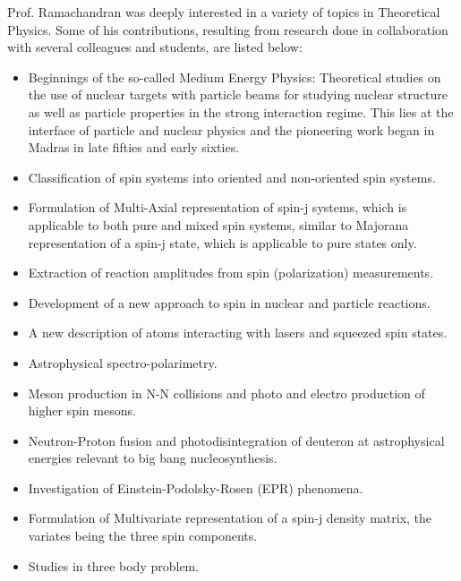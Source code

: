 Prof. Ramachandran was deeply interested in a variety of topics in Theoretical Physics. Some of his contributions, resulting from research done in collaboration with several colleagues and students, are listed below:
\begin{itemize}
\item Beginnings of the so-called Medium Energy Physics: Theoretical studies on the use of nuclear targets with particle beams for studying nuclear structure as well as particle properties in the strong interaction regime. This lies at the interface of particle and nuclear physics and the pioneering work began in Madras in late fifties and early sixties.

\item Classification of spin systems into oriented and non-oriented spin systems.

\item Formulation of Multi-Axial representation of spin-j systems, which is applicable to both pure and mixed spin systems, similar to Majorana representation of a spin-j state, which is applicable to pure states only.

\item Extraction of reaction amplitudes from spin (polarization) measurements.

\item Development of a new approach to spin in nuclear and particle reactions.

\item A new description of atoms interacting with lasers and squeezed spin states.

\item Astrophysical spectro-polarimetry.

\item Meson production in N-N collisions and photo and electro production of higher spin mesons.

\item Neutron-Proton fusion and photodisintegration of deuteron at astrophysical energies relevant to big bang nucleosynthesis.

\item Investigation of Einstein-Podolsky-Rosen (EPR) phenomena.

\item Formulation of Multivariate representation of a spin-j density matrix, the variates being the three spin components.

\item Studies in three body problem.
\end{itemize}

